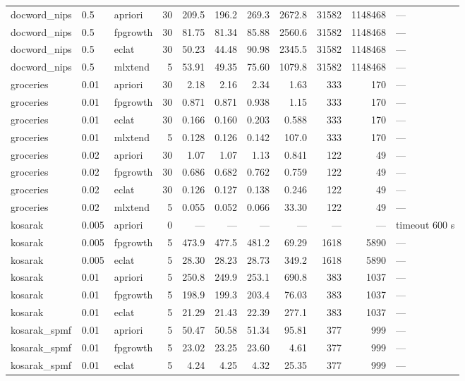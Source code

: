 \documentclass[twocolumn,10pt]{article}
\begin{document}
\begin{longtable}{p{3.0cm}llrrrrrrrp{2.4cm}}
docword\_\allowbreak{}nips & 0.5 & apriori & 30 & 209.5 & 196.2 & 269.3 & 2672.8 & 31582 & 1148468 & --- \\
docword\_\allowbreak{}nips & 0.5 & fpgrowth & 30 & 81.75 & 81.34 & 85.88 & 2560.6 & 31582 & 1148468 & --- \\
docword\_\allowbreak{}nips & 0.5 & eclat & 30 & 50.23 & 44.48 & 90.98 & 2345.5 & 31582 & 1148468 & --- \\
docword\_\allowbreak{}nips & 0.5 & mlxtend & 5 & 53.91 & 49.35 & 75.60 & 1079.8 & 31582 & 1148468 & --- \\
groceries & 0.01 & apriori & 30 & 2.18 & 2.16 & 2.34 & 1.63 & 333 & 170 & --- \\
groceries & 0.01 & fpgrowth & 30 & 0.871 & 0.871 & 0.938 & 1.15 & 333 & 170 & --- \\
groceries & 0.01 & eclat & 30 & 0.166 & 0.160 & 0.203 & 0.588 & 333 & 170 & --- \\
groceries & 0.01 & mlxtend & 5 & 0.128 & 0.126 & 0.142 & 107.0 & 333 & 170 & --- \\
groceries & 0.02 & apriori & 30 & 1.07 & 1.07 & 1.13 & 0.841 & 122 & 49 & --- \\
groceries & 0.02 & fpgrowth & 30 & 0.686 & 0.682 & 0.762 & 0.759 & 122 & 49 & --- \\
groceries & 0.02 & eclat & 30 & 0.126 & 0.127 & 0.138 & 0.246 & 122 & 49 & --- \\
groceries & 0.02 & mlxtend & 5 & 0.055 & 0.052 & 0.066 & 33.30 & 122 & 49 & --- \\
kosarak & 0.005 & apriori & 0 & --- & --- & --- & --- & --- & --- & timeout 600 s \\
kosarak & 0.005 & fpgrowth & 5 & 473.9 & 477.5 & 481.2 & 69.29 & 1618 & 5890 & --- \\
kosarak & 0.005 & eclat & 5 & 28.30 & 28.23 & 28.73 & 349.2 & 1618 & 5890 & --- \\
kosarak & 0.01 & apriori & 5 & 250.8 & 249.9 & 253.1 & 690.8 & 383 & 1037 & --- \\
kosarak & 0.01 & fpgrowth & 5 & 198.9 & 199.3 & 203.4 & 76.03 & 383 & 1037 & --- \\
kosarak & 0.01 & eclat & 5 & 21.29 & 21.43 & 22.39 & 277.1 & 383 & 1037 & --- \\
kosarak\_\allowbreak{}spmf & 0.01 & apriori & 5 & 50.47 & 50.58 & 51.34 & 95.81 & 377 & 999 & --- \\
kosarak\_\allowbreak{}spmf & 0.01 & fpgrowth & 5 & 23.02 & 23.25 & 23.60 & 4.61 & 377 & 999 & --- \\
kosarak\_\allowbreak{}spmf & 0.01 & eclat & 5 & 4.24 & 4.25 & 4.32 & 25.35 & 377 & 999 & --- \\

\end{longtable}
\end{document}
